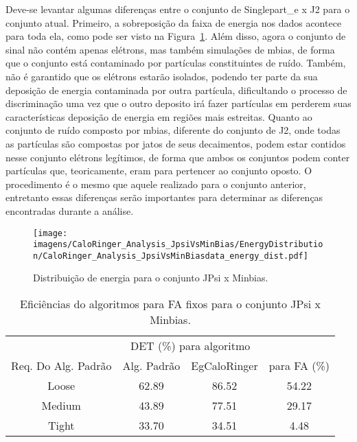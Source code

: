 Deve-se levantar algumas diferenças entre o conjunto de Singlepart\_e x J2 para
o conjunto atual. Primeiro, a sobreposição da faixa de energia nos dados
acontece para toda ela, como pode ser visto na
Figura~\ref{fig:jpsixminb_dist_energia}. Além disso, agora o conjunto de sinal
não contém apenas elétrons, mas também simulações de \gls{mbias}, de forma que o
conjunto está contaminado por partículas constituintes de ruído. Também, não é
garantido que os elétrons estarão isolados, podendo ter parte da sua deposição
de energia contaminada por outra partícula, dificultando o processo de
discriminação uma vez que o outro deposito irá fazer partículas \gls{em}
perderem suas características deposição de energia em regiões mais estreitas.
Quanto ao conjunto de ruído composto por \gls{mbias}, diferente do conjunto de
J2, onde todas as partículas são compostas por jatos de seus decaimentos, podem
estar contidos nesse conjunto elétrons legítimos, de forma que ambos os conjuntos
podem conter partículas que, teoricamente, eram para pertencer ao conjunto
oposto. O procedimento é o mesmo que aquele realizado para o conjunto anterior, entretanto
essas diferenças serão importantes para determinar as diferenças encontradas
durante a análise.

\begin{figure}[ht]
\centering
\texttt{[image: imagens/CaloRinger\_Analysis\_JpsiVsMinBias/EnergyDistribution/CaloRinger\_Analysis\_JpsiVsMinBiasdata\_energy\_dist.pdf]}
\caption{Distribuição de energia para o conjunto JPsi x Minbias.}
\label{fig:jpsixminb_dist_energia}
\end{figure}

\begin{table}[htb]
\centering
\begin{tabular}{cccc}
\hline
\hline
 & 
\multicolumn{2}{c}{DET (\%) para algoritmo} & 
\\
\cline{2-3}
\multirow{-2}{*}{Req. Do Alg. Padrão} & 
Alg. Padrão & 
EgCaloRinger & 
\multirow{-2}{*}{para FA (\%)} \\
\hline
Loose  & 62.89 & 86.52 & 54.22\\
Medium & 43.89 & 77.51 & 29.17\\
Tight  & 33.70 & 34.51 & 4.48 \\
\hline
\hline
\end{tabular}
\caption{Eficiências do algoritmos para FA fixos para o conjunto JPsi x Minbias.}
\label{tab:jpsixminb_efic}
\end{table}


